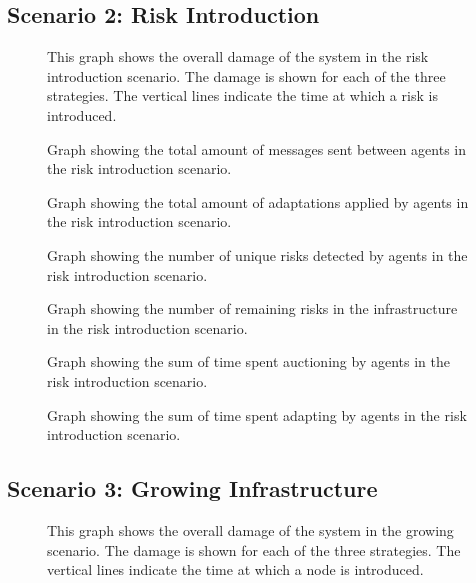 \subsection{Scenario 2: Risk Introduction}
\begin{figure}[H]
    \centering
    
    \caption{This graph shows the overall damage of the system in the risk introduction scenario. The damage is shown for each of the three strategies. The vertical lines indicate the time at which a risk is introduced.}
    \label{fig:overall-damage-inroduce-risk}
\end{figure}

\begin{figure}[H]
    \centering
    
    \caption{Graph showing the total amount of messages sent between agents in the risk introduction scenario.}
\end{figure}
\begin{figure}[H]
    \centering
    
    \caption{Graph showing the total amount of adaptations applied by agents in the risk introduction scenario.}
\end{figure}
\begin{figure}[H]
    \centering
        
    \caption{Graph showing the number of unique risks detected by agents in the risk introduction scenario.}
\end{figure}
\begin{figure}[H]
    \centering
        
    \caption{Graph showing the number of remaining risks in the infrastructure in the risk introduction scenario.}
\end{figure}
\begin{figure}[H]
    \centering
        
    \caption{Graph showing the sum of time spent auctioning by agents in the risk introduction scenario.}
\end{figure}
\begin{figure}[H]
    \centering
        
    \caption{Graph showing the sum of time spent adapting by agents in the risk introduction scenario.}
\end{figure}

\subsection{Scenario 3: Growing Infrastructure}
\begin{figure}[H]
    \centering
    
    \caption{This graph shows the overall damage of the system in the growing scenario. The damage is shown for each of the three strategies. The vertical lines indicate the time at which a node is introduced.}
    \label{fig:overall-damage-growing}
\end{figure}


